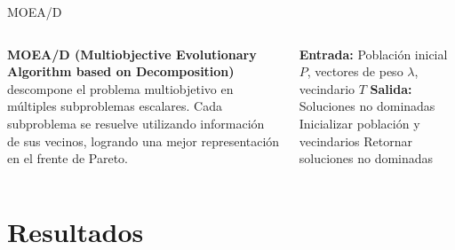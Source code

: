 \documentclass[aspectratio=169,xcolor=dvipsnames]{beamer}
\begin{document}
\begin{frame}{MOEA/D}
    \begin{columns}[T]
        \justifying
        \textbf{MOEA/D (Multiobjective Evolutionary Algorithm based on Decomposition)} descompone el problema multiobjetivo en múltiples subproblemas escalares. Cada subproblema se resuelve utilizando información de sus vecinos, logrando una mejor representación en el frente de Pareto.


        \scriptsize
        \begin{algorithm}[H]
            \caption{MOEA/D Algorithm}\label{alg:moead}
            \textbf{Entrada:} Población inicial $P$, vectores de peso $\lambda$, vecindario $T$\;
            \textbf{Salida:} Soluciones no dominadas\;
            Inicializar población y vecindarios\;
            Retornar soluciones no dominadas\;
        \end{algorithm}
    \end{columns}
\end{frame}

\section{Resultados}
\end{document}
